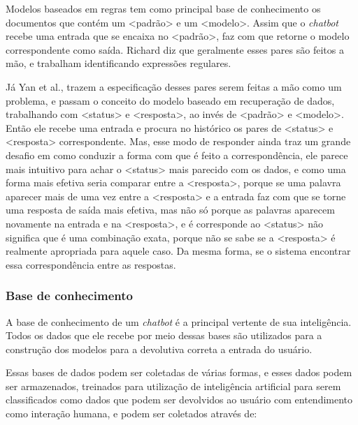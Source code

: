 \documentclass[
	12pt,				%
	oneside,
	a4paper,			%
	english,			%
	french,				%
	spanish,			%
	brazil				%
	]{abntex2}
\begin{document}
Modelos baseados em regras tem como principal base de conhecimento os documentos que contém um <padrão> e um <modelo>. Assim que o \emph{chatbot} recebe uma entrada que se encaixa no <padrão>, faz com que retorne o modelo correspondente como saída. Richard diz que geralmente esses pares são feitos a mão, e trabalham identificando expressões regulares.

Já Yan et al.\supercite{yan-etal-2016-docchat}, trazem a especificação desses pares serem feitas a mão como um problema, e passam o conceito do modelo baseado em recuperação de dados, trabalhando com <status> e <resposta>, ao invés de <padrão> e <modelo>. Então ele recebe uma entrada e procura no histórico os pares de <status> e <resposta> correspondente. Mas, esse modo de responder ainda traz um grande desafio em como conduzir a forma com que é feito a correspondência, ele parece mais intuitivo para achar o <status> mais parecido com os dados, e como uma forma mais efetiva seria comparar entre a <resposta>, porque se uma palavra aparecer mais de uma vez entre a <resposta> e a entrada faz com que se torne uma resposta de saída mais efetiva, mas não só porque as palavras aparecem novamente na entrada e na <resposta>, e é corresponde ao <status> não significa que é uma combinação exata, porque não se sabe se a <resposta> é realmente apropriada para aquele caso. Da mesma forma, se o sistema encontrar essa correspondência entre as respostas.

\subsubsection{Base de conhecimento}
A base de conhecimento de um \emph{chatbot} é a principal vertente de sua inteligência. Todos os dados que ele recebe por meio dessas bases são utilizados para a construção dos modelos para a devolutiva correta a entrada do usuário.

Essas bases de dados podem ser coletadas de várias formas, e esses dados podem ser armazenados, treinados para utilização de inteligência artificial para serem classificados como dados que podem ser devolvidos ao usuário com entendimento como interação humana, e podem ser coletados através de:
\end{document}
